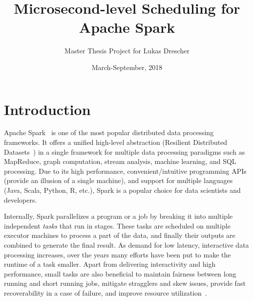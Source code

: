 \documentclass[10pt,a4paper]{article}
\begin{document}
\title{Microsecond-level Scheduling for Apache Spark}

\author{Master Thesis Project for Lukas Drescher}
\date{March-September, 2018}

\maketitle



\section*{Introduction}
Apache Spark~\cite{2018-apache-spark} is one of the most popular distributed
data processing frameworks. It offers a unified high-level abstraction 
(Resilient Distributed Datasets~\cite{2011-nsdi-rdd}) in a single framework 
for multiple data processing paradigms such as MapReduce, graph computation,
stream analysis, machine learning, and SQL processing. Due to its high
performance, convenient/intuitive programming APIs (provide an illusion 
of a single machine), and support for multiple languages (Java, Scala, Python, 
R, etc.), Spark is a popular choice for data scientists and developers. 


Internally, Spark parallelizes a program or a job by breaking it into multiple 
independent \textit{tasks} that run in stages. These tasks are scheduled on
multiple executor machines to process a part of the data, and finally their
outputs are combined to generate the final result. As demand for low latency, 
interactive data processing increases, over the years many efforts have been 
put to make the runtime of a task smaller. Apart from delivering interactivity 
and high performance, small tasks are also beneficial to maintain fairness 
between long running and short running jobs, mitigate stragglers and 
skew issues, provide fast recoverability in a case of failure, and improve 
resource utilization~\cite{2013-hotos-tiny-tasks}. 
\end{document}
